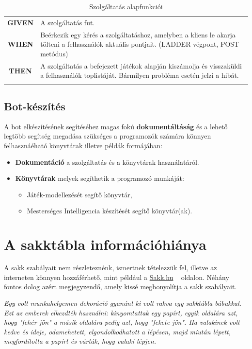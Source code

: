 \documentclass[twoside, a4paper, 12pt]{book}
\begin{document}
\begin{longtable}[c]{|c|p{14cm}|}
	\textbf{GIVEN} &
	A szolgáltatás fut.
	\\ \nobreakhline
	
	\textbf{WHEN} &
	Beérkezik egy kérés a szolgáltatáshoz, amelyben a kliens le akarja tölteni a felhasználók aktuális pontjait. (LADDER végpont, POST metódus)
	\\
	\nobreakhline
	
	\textbf{THEN} &
	A szolgáltatás a befejezett játékok alapján kiszámolja és visszaküldi a felhasználók toplistáját.
	Bármilyen probléma esetén jelzi a hibát.
	\\
	\hline
	
	\caption{Szolgáltatás alapfunkciói}
	\label{userStories:server:api}\\
\end{longtable} 

\subsection{Bot-készítés}
A bot elkészítésének segítéséhez magas fokú \textbf{dokumentáltáság} és a lehető legtöbb segítség megadása szükséges a programozók számára könnyen felhasznáéható könyvtárak illetve példák formájában:
\begin{itemize}
	\item \textbf{Dokumentáció} a szolgáltatás és a könyvtárak használatáról.
	\item \textbf{Könyvtárak} melyek segíthetik a programozó munkáját:
	\begin{itemize}
		\item Játék-modellezését segítő könyvtár,
		\item Mesterséges Intelligencia készítését segítő könyvtár(ak).
	\end{itemize}
\end{itemize}

\section{A sakktábla információhiánya}\label{A Sakktábla információhiánya}
A sakk szabályait nem részleteznénk, ismertnek tételezzük fel, illetve az interneten könnyen hozzáférhető, mint például a \href{http://www.sakk.hu/help/sakk_szabalyok.html}{Sakk.hu} ~\cite{chessrulessakkhu} oldalon. Néhány fontos dolog azért megjegyzendő, amely kissé megbonyolítja a sakk szabályait.

\textit{Egy volt munkahelyemen dekoráció gyanánt ki volt rakva egy sakktábla bábukkal. Ezt az emberek elkezdték használni: kinyomtattak egy papírt, egyik oldalára azt, hogy "fehér jön" a másik oldalára pedig azt, hogy "fekete jön". Ha valakinek volt kedve és ideje, odamehetett, elgondolkodhatott a lépésen, majd miután lépett, megfordította a papírt és várták, hogy valaki lépjen.}
\end{document}
